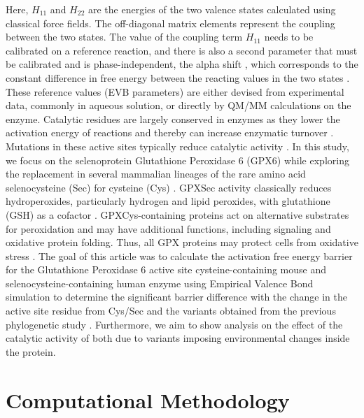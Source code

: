 \documentclass{article}
\begin{document}
Here, \(H_{11}\) and \(H_{22}\) are the energies of the two valence states calculated using classical force fields. The off-diagonal matrix elements represent the coupling between the two states. The value of the coupling term \(H_{11}\) needs to be calibrated on a reference reaction, and there is also a second parameter that must be calibrated and is phase-independent, the alpha shift \cite{Oanca2023}, which corresponds to the constant difference in free energy between the reacting values in the two states \cite{Oanca2023}. These reference values (EVB parameters) are either devised from experimental data, commonly in aqueous solution, or directly by QM/MM calculations on the enzyme. Catalytic residues are largely conserved in enzymes as they lower the activation energy of reactions and thereby can increase enzymatic turnover \cite{Rees2024}. Mutations in these active sites typically reduce catalytic activity \cite{Rees2024}. In this study, we focus on the selenoprotein Glutathione Peroxidase 6 (GPX6) while exploring the replacement in several mammalian lineages of the rare amino acid selenocysteine (Sec) for cysteine (Cys) \cite{Rees2024}. GPXSec activity classically reduces hydroperoxides, particularly hydrogen and lipid peroxides, with glutathione (GSH) as a cofactor \cite{Rees2024}. GPXCys-containing proteins act on alternative substrates for peroxidation and may have additional functions, including signaling and oxidative protein folding. Thus, all GPX proteins may protect cells from oxidative stress \cite{Rees2024}. The goal of this article was to calculate the activation free energy barrier for the Glutathione Peroxidase 6 active site cysteine-containing mouse and selenocysteine-containing human enzyme using Empirical Valence Bond simulation to determine the significant barrier difference with the change in the active site residue from Cys/Sec and the variants obtained from the previous phylogenetic study \cite{Rees2024}. Furthermore, we aim to show analysis on the effect of the catalytic activity of both due to variants imposing environmental changes inside the protein.

\section{Computational Methodology}
\end{document}
